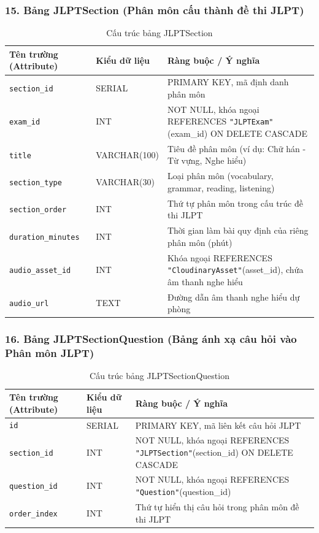 \documentclass[../DoAn.tex]{subfiles}
\begin{document}
\subsubsection*{15. Bảng JLPTSection (Phân môn cấu thành đề thi JLPT)}
\begin{table}[H]
\centering
\footnotesize
\renewcommand{\arraystretch}{1.2}
\begin{tabular}{|p{4.2cm}|p{3.2cm}|p{7.1cm}|}
\hline
\textbf{Tên trường (Attribute)} & \textbf{Kiểu dữ liệu} & \textbf{Ràng buộc / Ý nghĩa} \\
\hline
\texttt{section\_id} & SERIAL & PRIMARY KEY, mã định danh phân môn \\
\hline
\texttt{exam\_id} & INT & NOT NULL, khóa ngoại REFERENCES \texttt{"JLPTExam"}(exam\_id) ON DELETE CASCADE \\
\hline
\texttt{title} & VARCHAR(100) & Tiêu đề phân môn (ví dụ: Chữ hán - Từ vựng, Nghe hiểu) \\
\hline
\texttt{section\_type} & VARCHAR(30) & Loại phân môn (vocabulary, grammar, reading, listening) \\
\hline
\texttt{section\_order} & INT & Thứ tự phân môn trong cấu trúc đề thi JLPT \\
\hline
\texttt{duration\_minutes} & INT & Thời gian làm bài quy định của riêng phân môn (phút) \\
\hline
\texttt{audio\_asset\_id} & INT & Khóa ngoại REFERENCES \texttt{"CloudinaryAsset"}(asset\_id), chứa âm thanh nghe hiểu \\
\hline
\texttt{audio\_url} & TEXT & Đường dẫn âm thanh nghe hiểu dự phòng \\
\hline
\end{tabular}
\caption{Cấu trúc bảng JLPTSection}
\label{tab:schema_jlptsection}
\end{table}

\subsubsection*{16. Bảng JLPTSectionQuestion (Bảng ánh xạ câu hỏi vào Phân môn JLPT)}
\begin{table}[H]
\centering
\footnotesize
\renewcommand{\arraystretch}{1.2}
\begin{tabular}{|p{4.2cm}|p{3.2cm}|p{7.1cm}|}
\hline
\textbf{Tên trường (Attribute)} & \textbf{Kiểu dữ liệu} & \textbf{Ràng buộc / Ý nghĩa} \\
\hline
\texttt{id} & SERIAL & PRIMARY KEY, mã liên kết câu hỏi JLPT \\
\hline
\texttt{section\_id} & INT & NOT NULL, khóa ngoại REFERENCES \texttt{"JLPTSection"}(section\_id) ON DELETE CASCADE \\
\hline
\texttt{question\_id} & INT & NOT NULL, khóa ngoại REFERENCES \texttt{"Question"}(question\_id) \\
\hline
\texttt{order\_index} & INT & Thứ tự hiển thị câu hỏi trong phân môn đề thi JLPT \\
\hline
\end{tabular}
\caption{Cấu trúc bảng JLPTSectionQuestion}
\label{tab:schema_jlptsectionquestion}
\end{table}
\end{document}
